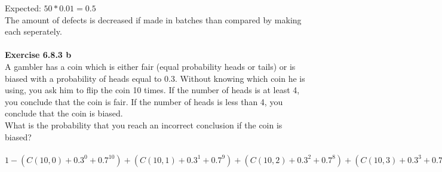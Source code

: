 \documentclass{article}
\begin{document}
Expected: $50 * 0.01 = 0.5$\\
The amount of defects is decreased if made in batches than compared by making each seperately.\\\\
\textbf{Exercise 6.8.3 b}\\
A gambler has a coin which is either fair (equal probability heads or tails) or is biased with a probability of heads equal to 0.3. Without knowing which coin he is using, you ask him to flip the coin 10 times. If the number of heads is at least 4, you conclude that the coin is fair. If the number of heads is less than 4, you conclude that the coin is biased.\\
What is the probability that you reach an incorrect conclusion if the coin is biased?\\\\
$1 - (C(10,0) + 0.3^0 + 0.7^{10}) + (C(10,1) + 0.3^1 + 0.7^9) + (C(10,2) + 0.3^2 + 0.7^8) + (C(10,3) + 0.3^3 + 0.7^7) \approx 0.35$
\end{document}
